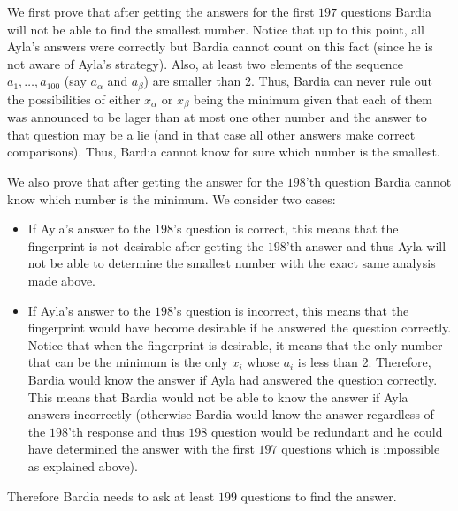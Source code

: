 \begin{solution}
We first prove that after getting the answers for the first $197$ questions Bardia will not be able to find the smallest number. Notice that up to this point, all Ayla's answers were correctly but Bardia cannot count on this fact (since he is not aware of Ayla's strategy). Also, at least two elements of the sequence $a_1, \ldots, a_{100}$ (say $a_{\alpha}$ and $a_{\beta}$) are smaller than $2$. Thus, Bardia can never rule out the possibilities of either $x_{\alpha}$ or $x_{\beta}$ being the minimum given that each of them was announced to be lager than at most one other number and the answer to that question may be a lie (and in that case all other answers make correct comparisons). Thus, Bardia cannot know for sure which number is the smallest.

We also prove that after getting the answer for the $198$'th question Bardia cannot know which number is the minimum. We consider two cases: 
\begin{itemize}
	\item If Ayla's answer to the $198$'s question is correct, this means that the fingerprint is not desirable after getting the $198$'th answer and thus Ayla will not be able to determine the smallest number with the exact same analysis made above.
	\item If Ayla's answer to the $198$'s question is incorrect, this means that the fingerprint would have become desirable if he answered the question correctly. Notice that when the fingerprint is desirable, it means that the only number that can be the minimum is the only $x_i$ whose $a_i$ is less than 2. Therefore, Bardia would know the answer if Ayla had answered the question correctly. This means that Bardia would not be able to know the answer if Ayla answers incorrectly (otherwise Bardia would know the answer regardless of the $198$'th response and thus $198$ question would be redundant and he could have determined the answer with the first $197$ questions which is impossible as explained above).
\end{itemize}

Therefore Bardia needs to ask at least $199$ questions to find the answer.
\end{solution}
